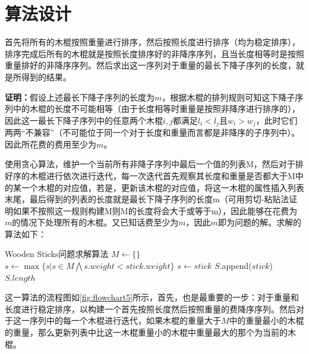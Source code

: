 \documentclass{report}
\begin{document}
\section{算法设计}
\label{sec:suan_fa_she_ji_5}
首先将所有的木棍按照重量进行排序，然后按照长度进行排序（均为稳定排序），排序完成后所有的木棍就是按照长度排序好的非降序序列，且当长度相等时是按照重量排好的非降序序列。然后求出这一序列对于重量的最长下降子序列的长度，就是所得到的结果。\par

\textbf{证明：}假设上述最长下降子序列的长度为$m$，根据木棍的排列规则可知这下降子序列中的木棍的长度不可能相等（由于长度相等时重量是按照非降序进行排序的），因此这一最长下降子序列中的任意两个木棍$i,j$都满足$l_i<l_j$且$w_i>w_j$，此时它们两两``不兼容''（不可能位于同一个对于长度和重量而言都是非降序的子序列中）。因此所花费的费用至少为$m$。\par

使用贪心算法，维护一个当前所有非降子序列中最后一个值的列表M，然后对于排好序的木棍进行依次进行迭代，每一次迭代首先观察其长度和重量是否都大于M中的某一个木棍的对应值，若是，更新该木棍的对应值，将这一木棍的属性插入列表末尾，最后得到的列表的长度就是最长下降子序列的长度m（可用剪切-粘贴法证明如果不按照这一规则构建M则M的长度将会大于或等于m），因此能够在花费为$m$的情况下处理所有的木棍。又已知话费至少为$m$，因此$m$即为问题的解。求解的算法如下：\par

\begin{simpleAlgorithm}{Wooden Sticks问题求解算法}
     
    \State {} 
    \State {} 
    \State $M \gets \{\}$
            \State $s \gets \max\{s | s \in M \bigwedge s.weight < stick.weight\}$
            \State $s \gets stick$
        \Else
            \State $S$.append($stick$)
        \EndIf
    \EndFor
    \State \Return $S.length$
    \EndProcedure
\end{simpleAlgorithm}

这一算法的流程图如\ref{fig:flowchart5}所示，首先，也是最重要的一步：对于重量和长度进行稳定排序，以构建一个首先按照长度然后按照重量的费降序序列。然后对于这一序列中的每一个木棍进行迭代，如果木棍的重量大于$M$中的重量最小的木棍的重量，那么更新列表中比这一木棍重量小的木棍中重量最大的那个为当前的木棍。
\end{document}
